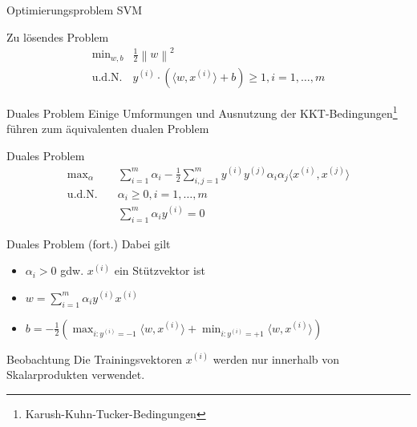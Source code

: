 \documentclass[xcolor={dvipsnames,svgnames},draft]{beamer}
\newcommand{\ignore}[1]{}
\newcommand{\inner}[2]{\langle{} #1, #2 \rangle{}}
\newcommand{\norm}[1]{\left\lVert#1\right\rVert}
\begin{document}
\begin{frame}{Optimierungsproblem SVM}
  \begin{exampleblock}{Zu lösendes Problem}
    \[
      \begin{array}{rl}
        \text{min}_{w,b} & \frac{1}{2}\norm{w}^2 \\
        \text{u.d.N.} & y^{(i)} \cdot (\inner{w}{x^{(i)}} + b) \geq 1, i = 1, \ldots, m
      \end{array}
    \]
  \end{exampleblock}
\ignore{
Einführung von (verallgemeinerten) Lagrange-Multiplikatoren ergibt dann
\[
  \mathcal{L}(w,b,\alpha) = \frac{1}{2}\norm{w}^2 
    - \sum_{i=1}^m{\alpha_i \left[ y^{(i)}(\inner{w}{x^{(i)}} + b) - 1 \right]}
\]}
\end{frame}

\begin{frame}{Duales Problem}
  Einige Umformungen und Ausnutzung der KKT-Bedingungen\footnote{Karush-Kuhn-Tucker-Bedingungen} führen zum äquivalenten
  dualen Problem

  \begin{exampleblock}{Duales Problem}
    \vspace{-1em}
    \begin{align*}
        \text{max}_{\alpha} \quad& \sum_{i=1}^m\alpha_i 
                              - \frac{1}{2}\sum_{i,j=1}^m y^{(i)}y^{(j)}\alpha_i\alpha_j\inner{x^{(i)}}{x^{(j)}}  \\
        \text{u.d.N.} \quad& \alpha_i \geq 0, i = 1, \ldots, m \\
                            & \sum_{i=1}^m \alpha_i y^{(i)} = 0
    \end{align*}
  \end{exampleblock}
\end{frame}

\begin{frame}{Duales Problem (fort.)}
  Dabei gilt
  \begin{itemize}
    \item $\alpha_i > 0$ gdw. $x^{(i)}$ ein Stützvektor ist
    \item $w = \sum_{i=1}^m \alpha_i y^{(i)} x^{(i)}$
    \item $b = -\frac{1}{2}(\max_{i:y^{(i)}=-1} \inner{w}{x^{(i)}} + \min_{i:y^{(i)}=+1} \inner{w}{x^{(i)}} )$
  \end{itemize}

  \begin{block}{Beobachtung}
    Die Trainingsvektoren $x^{(i)}$ werden nur innerhalb von
    Skalarprodukten verwendet.
  \end{block}
\end{frame}
\end{document}
